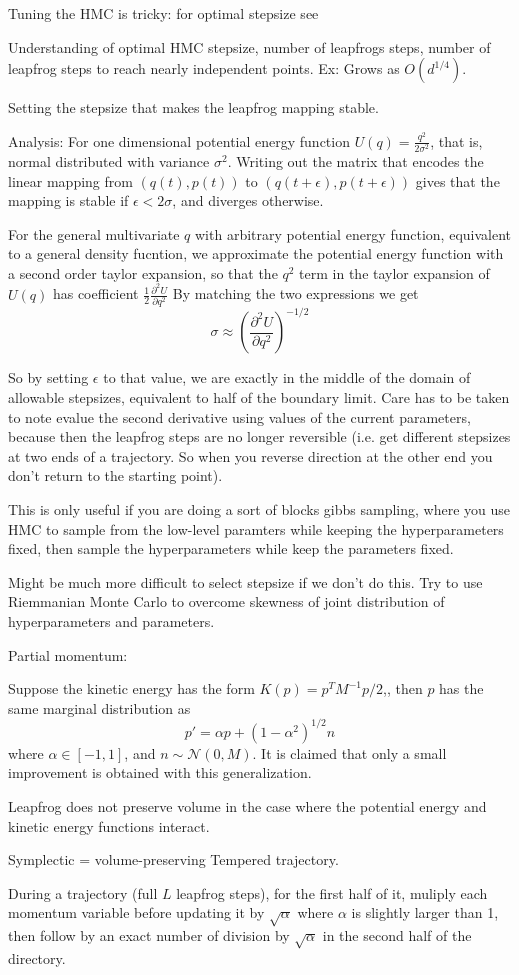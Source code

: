 \documentclass{book}
\begin{document}
\begin{enumerate}
Tuning the HMC is tricky: for optimal stepsize see \cite{beskos2013optimal}

Understanding of optimal HMC stepsize, number of leapfrogs steps, number of leapfrog steps to reach nearly independent points.
Ex: Grows as $O(d^{1/4})$.

Setting the stepsize that makes the leapfrog mapping stable.

Analysis: For one dimensional potential energy function $U(q) = \frac{q^2}{2\sigma^2}$,
that is, normal distributed with variance $\sigma^2$. Writing out the matrix that encodes the linear mapping from $(q(t),p(t))$ to $(q(t+\epsilon),p(t+\epsilon))$ gives that the mapping is stable if $\epsilon < 2 \sigma$, and diverges otherwise. 

For the general multivariate $q$ with arbitrary potential energy function, equivalent to a general density fucntion, we approximate the potential energy function with a second order taylor expansion, so that the $q^2$ term in the taylor expansion of $U(q)$ has coefficient $\frac{1}{2} \frac{\partial^2 U}{\partial q^2}$  
By matching the two expressions we get 
\[ \sigma \approx ( \frac{\partial^2 U}{\partial q^2})^{-1/2} \]

So by setting $\epsilon$ to that value, we are exactly in the middle of the domain of allowable stepsizes, equivalent to half of the boundary limit.
Care has to be taken to note evalue the second derivative using values of the current parameters, because then the leapfrog steps are no longer reversible (i.e. get different stepsizes at two ends of a trajectory. So when you reverse direction at the other end you don't return to  the starting point). 

This is only useful if you are doing a sort of blocks gibbs sampling, where you use HMC to sample from the low-level paramters while keeping the hyperparameters fixed, then sample the hyperparameters while keep the parameters fixed. 

Might be much more difficult to select stepsize if we don't do this. Try to use Riemmanian Monte Carlo to overcome skewness of joint distribution of hyperparameters and parameters. 

Partial momentum:

Suppose the kinetic energy has the form $K(p) = p^TM^{-1}p/2$,, then $p$ has the same marginal distribution as 
\[ p' = \alpha p + (1-\alpha^2)^{1/2} n \]
where $\alpha \in [-1,1]$, and $n \sim \mathcal{N}(0,M)$. 
It is claimed that only a small improvement is obtained with this generalization.

Leapfrog does not preserve volume in the case where the potential energy and kinetic energy functions interact.

Symplectic  = volume-preserving
Tempered trajectory. 

During a trajectory (full $L$ leapfrog steps), for the first half of it, muliply
each momentum variable before updating it by $\sqrt{\alpha}$ where $\alpha$ is slightly larger than
1, then follow by an exact number of division by $\sqrt{\alpha}$ in the second
half of the directory. \cite{neal1996sampling}

\end{enumerate}
\end{document}
